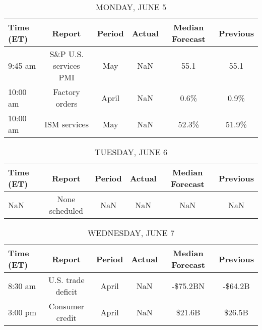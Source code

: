 \documentclass{article}%
\begin{document}
%
\normalsize%


\begin{table}[htbp]%
\caption{MONDAY, JUNE 5}%
\centering%
\begin{adjustbox}{width=1\textwidth}%
\begin{tabular}{lccccc}
\toprule
Time (ET) &                Report & Period & Actual & Median Forecast & Previous \\
\midrule
  9:45 am & S\&P U.S. services PMI &    May &    NaN &            55.1 &     55.1 \\
 10:00 am &        Factory orders &  April &    NaN &            0.6\% &     0.9\% \\
 10:00 am &          ISM services &    May &    NaN &           52.3\% &    51.9\% \\
\bottomrule
\end{tabular}
%
\end{adjustbox}%
\end{table}

%


\begin{table}[htbp]%
\caption{TUESDAY, JUNE 6}%
\centering%
\begin{adjustbox}{width=1\textwidth}%
\begin{tabular}{lccccc}
\toprule
Time (ET) &         Report & Period & Actual & Median Forecast & Previous \\
\midrule
      NaN & None scheduled &    NaN &    NaN &             NaN &      NaN \\
\bottomrule
\end{tabular}
%
\end{adjustbox}%
\end{table}

%


\begin{table}[htbp]%
\caption{WEDNESDAY, JUNE 7}%
\centering%
\begin{adjustbox}{width=1\textwidth}%
\begin{tabular}{lccccc}
\toprule
Time (ET) &             Report & Period & Actual & Median Forecast & Previous \\
\midrule
  8:30 am & U.S. trade deficit &  April &    NaN &        -\$75.2BN &  -\$64.2B \\
  3:00 pm &    Consumer credit &  April &    NaN &          \$21.6B &   \$26.5B \\
\bottomrule
\end{tabular}
%
\end{adjustbox}%
\end{table}
\end{document}
